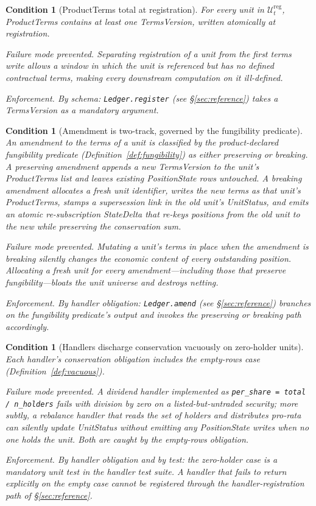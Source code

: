 \documentclass[11pt,a4paper]{article}
\newtheorem{condition}[definition]{Condition}
\begin{document}
\begin{condition}[ProductTerms total at registration]\label{cond:termsregistrationtotal}
For every unit in $\mathcal{U}_t^{\mathrm{reg}}$, ProductTerms contains at least one TermsVersion, written atomically at registration.

\emph{Failure mode prevented.} Separating registration of a unit from the first terms write allows a window in which the unit is referenced but has no defined contractual terms, making every downstream computation on it ill-defined.

\emph{Enforcement.} By schema: \texttt{Ledger.register} (see \S\ref{sec:reference}) takes a TermsVersion as a mandatory argument.
\end{condition}

\begin{condition}[Amendment is two-track, governed by the fungibility predicate]\label{cond:amendment}
An amendment to the terms of a unit is classified by the product-declared fungibility predicate (Definition~\ref{def:fungibility}) as either preserving or breaking. A preserving amendment appends a new TermsVersion to the unit's ProductTerms list and leaves existing PositionState rows untouched. A breaking amendment allocates a fresh unit identifier, writes the new terms as that unit's ProductTerms, stamps a supersession link in the old unit's UnitStatus, and emits an atomic re-subscription StateDelta that re-keys positions from the old unit to the new while preserving the conservation sum.

\emph{Failure mode prevented.} Mutating a unit's terms in place when the amendment is breaking silently changes the economic content of every outstanding position. Allocating a fresh unit for every amendment---including those that preserve fungibility---bloats the unit universe and destroys netting.

\emph{Enforcement.} By handler obligation: \texttt{Ledger.amend} (see \S\ref{sec:reference}) branches on the fungibility predicate's output and invokes the preserving or breaking path accordingly.
\end{condition}

\begin{condition}[Handlers discharge conservation vacuously on zero-holder units]\label{cond:vacuous}
Each handler's conservation obligation includes the empty-rows case (Definition~\ref{def:vacuous}).

\emph{Failure mode prevented.} A dividend handler implemented as \texttt{per\_share = total / n\_holders} fails with division by zero on a listed-but-untraded security; more subtly, a rebalance handler that reads the set of holders and distributes pro-rata can silently update UnitStatus without emitting any PositionState writes when no one holds the unit. Both are caught by the empty-rows obligation.

\emph{Enforcement.} By handler obligation and by test: the zero-holder case is a mandatory unit test in the handler test suite. A handler that fails to return explicitly on the empty case cannot be registered through the handler-registration path of \S\ref{sec:reference}.
\end{condition}
\end{document}
